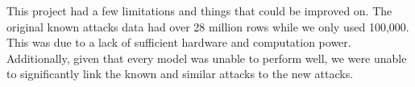 This project had a few limitations and things that could be improved on. The original known attacks data had over 28 million rows while we only used 100,000. This was due to a lack of sufficient hardware and computation power. Additionally, given that every model was unable to perform well, we were unable to significantly link the known and similar attacks to the new attacks.

\ifCLASSOPTIONcaptionsoff
  \newpage
\fi




\vfill
